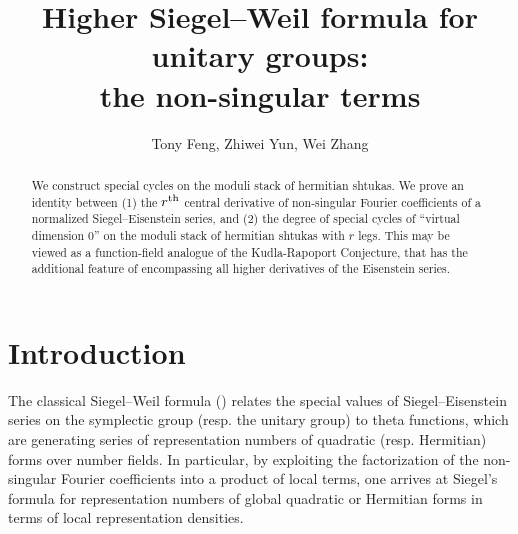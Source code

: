 \documentclass[reqno]{amsart}
\title[Higher Siegel--Weil: non-singular terms]{Higher Siegel--Weil formula
for unitary groups: \\ the non-singular terms}
\author{Tony Feng, Zhiwei Yun, Wei Zhang}
\numberwithin{equation}{section}
\theoremstyle{remark}
\numberwithin{equation}{section}
\begin{document}
\begin{abstract} We construct special cycles on the moduli stack of hermitian shtukas. We prove an identity between (1) the $r^{\rm th}$ central derivative of non-singular Fourier coefficients of a normalized Siegel--Eisenstein series, and  (2) the degree of special cycles of ``virtual dimension 0'' on the moduli stack of hermitian shtukas with $r$ legs. This may be viewed as a function-field analogue of the Kudla-Rapoport Conjecture, that has the additional feature of encompassing all higher derivatives of the Eisenstein series. 
\end{abstract}


\maketitle

\tableofcontents




\section{Introduction} 

The classical Siegel--Weil formula (\cite{Siegel1951, Weil1965}) relates the special values  of Siegel--Eisenstein series on the symplectic group (resp. the unitary group) to theta functions, which are generating series of representation numbers of quadratic (resp. Hermitian) forms over number fields. In particular, by exploiting the factorization of the non-singular Fourier coefficients into a product of local terms, one arrives at Siegel's formula for representation numbers of global quadratic or Hermitian forms in terms of local representation densities. 
\end{document}
